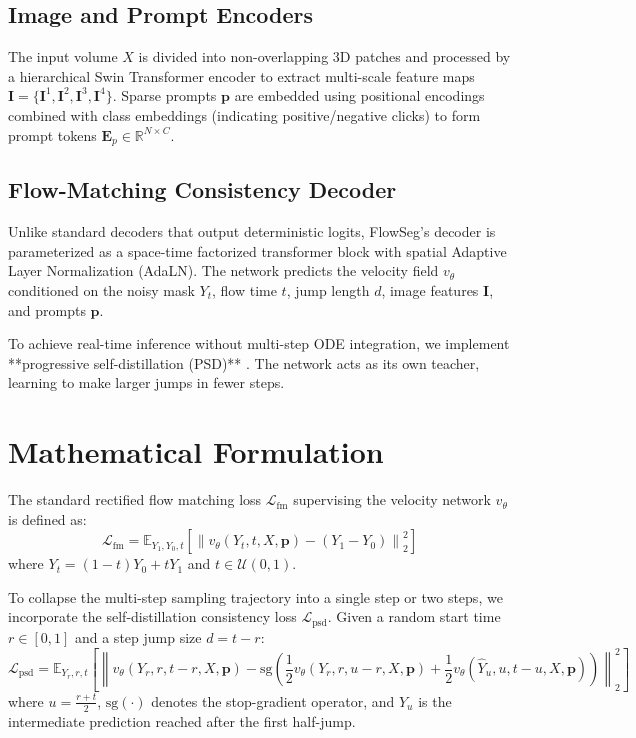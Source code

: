 \documentclass[10.1005,journal]{IEEEtran}
\begin{document}
\subsection{Image and Prompt Encoders}
The input volume $X$ is divided into non-overlapping 3D patches and processed by a hierarchical Swin Transformer encoder to extract multi-scale feature maps $\mathbf{I} = \{\mathbf{I}^1, \mathbf{I}^2, \mathbf{I}^3, \mathbf{I}^4\}$. Sparse prompts $\mathbf{p}$ are embedded using positional encodings combined with class embeddings (indicating positive/negative clicks) to form prompt tokens $\mathbf{E}_p \in \mathbb{R}^{N \times C}$.

\subsection{Flow-Matching Consistency Decoder}
Unlike standard decoders that output deterministic logits, FlowSeg's decoder is parameterized as a space-time factorized transformer block with spatial Adaptive Layer Normalization (AdaLN). The network predicts the velocity field $v_\theta$ conditioned on the noisy mask $Y_t$, flow time $t$, jump length $d$, image features $\mathbf{I}$, and prompts $\mathbf{p}$.

To achieve real-time inference without multi-step ODE integration, we implement **progressive self-distillation (PSD)** \cite{boffi2025how}. The network acts as its own teacher, learning to make larger jumps in fewer steps.

\section{Mathematical Formulation}
The standard rectified flow matching loss $\mathcal{L}_{\text{fm}}$ supervising the velocity network $v_\theta$ is defined as:
$$\mathcal{L}_{\text{fm}} = \mathbb{E}_{Y_1, Y_0, t} \left[ \left\| v_\theta(Y_t, t, X, \mathbf{p}) - (Y_1 - Y_0) \right\|_2^2 \right]$$
where $Y_t = (1-t)Y_0 + t Y_1$ and $t \in \mathcal{U}(0, 1)$.

To collapse the multi-step sampling trajectory into a single step or two steps, we incorporate the self-distillation consistency loss $\mathcal{L}_{\text{psd}}$. Given a random start time $r \in [0, 1]$ and a step jump size $d = t - r$:
$$\mathcal{L}_{\text{psd}} = \mathbb{E}_{Y_r, r, t} \left[ \left\| v_\theta(Y_r, r, t - r, X, \mathbf{p}) - \text{sg}\left( \frac{1}{2} v_\theta(Y_r, r, u - r, X, \mathbf{p}) + \frac{1}{2} v_\theta(\hat{Y}_u, u, t - u, X, \mathbf{p}) \right) \right\|_2^2 \right]$$
where $u = \frac{r + t}{2}$, $\text{sg}(\cdot)$ denotes the stop-gradient operator, and $\hat{Y}_u$ is the intermediate prediction reached after the first half-jump. 
\end{document}
